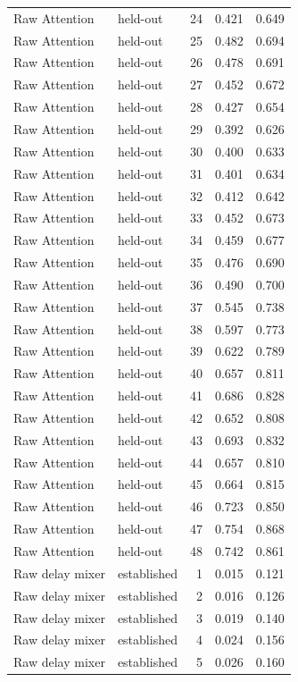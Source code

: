 \begin{tabular}{llrrr}
Raw Attention & held-out & 24 & 0.421 & 0.649 \\
Raw Attention & held-out & 25 & 0.482 & 0.694 \\
Raw Attention & held-out & 26 & 0.478 & 0.691 \\
Raw Attention & held-out & 27 & 0.452 & 0.672 \\
Raw Attention & held-out & 28 & 0.427 & 0.654 \\
Raw Attention & held-out & 29 & 0.392 & 0.626 \\
Raw Attention & held-out & 30 & 0.400 & 0.633 \\
Raw Attention & held-out & 31 & 0.401 & 0.634 \\
Raw Attention & held-out & 32 & 0.412 & 0.642 \\
Raw Attention & held-out & 33 & 0.452 & 0.673 \\
Raw Attention & held-out & 34 & 0.459 & 0.677 \\
Raw Attention & held-out & 35 & 0.476 & 0.690 \\
Raw Attention & held-out & 36 & 0.490 & 0.700 \\
Raw Attention & held-out & 37 & 0.545 & 0.738 \\
Raw Attention & held-out & 38 & 0.597 & 0.773 \\
Raw Attention & held-out & 39 & 0.622 & 0.789 \\
Raw Attention & held-out & 40 & 0.657 & 0.811 \\
Raw Attention & held-out & 41 & 0.686 & 0.828 \\
Raw Attention & held-out & 42 & 0.652 & 0.808 \\
Raw Attention & held-out & 43 & 0.693 & 0.832 \\
Raw Attention & held-out & 44 & 0.657 & 0.810 \\
Raw Attention & held-out & 45 & 0.664 & 0.815 \\
Raw Attention & held-out & 46 & 0.723 & 0.850 \\
Raw Attention & held-out & 47 & 0.754 & 0.868 \\
Raw Attention & held-out & 48 & 0.742 & 0.861 \\
Raw delay mixer & established & 1 & 0.015 & 0.121 \\
Raw delay mixer & established & 2 & 0.016 & 0.126 \\
Raw delay mixer & established & 3 & 0.019 & 0.140 \\
Raw delay mixer & established & 4 & 0.024 & 0.156 \\
Raw delay mixer & established & 5 & 0.026 & 0.160 \\

\end{tabular}

